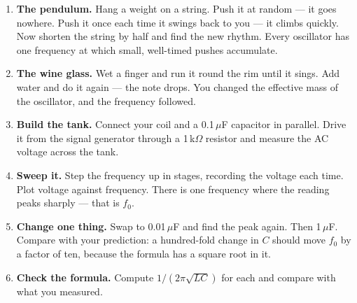 \begin{enumerate}
\item \textbf{The pendulum.} Hang a weight on a string. Push it at random ---
  it goes nowhere. Push it once each time it swings back to you --- it climbs
  quickly. Now shorten the string by half and find the new rhythm. Every
  oscillator has one frequency at which small, well-timed pushes accumulate.
\item \textbf{The wine glass.} Wet a finger and run it round the rim until it
  sings. Add water and do it again --- the note drops. You changed the effective
  mass of the oscillator, and the frequency followed.
\item \textbf{Build the tank.} Connect your coil and a 0.1\,$\mu$F capacitor in
  parallel. Drive it from the signal generator through a 1\,k$\Omega$ resistor
  and measure the AC voltage across the tank.
\item \textbf{Sweep it.} Step the frequency up in stages, recording the voltage
  each time. Plot voltage against frequency. There is one frequency where the
  reading peaks sharply --- that is $f_0$.
\item \textbf{Change one thing.} Swap to 0.01\,$\mu$F and find the peak again.
  Then 1\,$\mu$F. Compare with your prediction: a hundred-fold change in $C$
  should move $f_0$ by a factor of ten, because the formula has a square root
  in it.
\item \textbf{Check the formula.} Compute $1/(2\pi\sqrt{LC})$ for each and
  compare with what you measured.
\end{enumerate}

\begin{telosfacts}[0.20]
\end{telosfacts}

